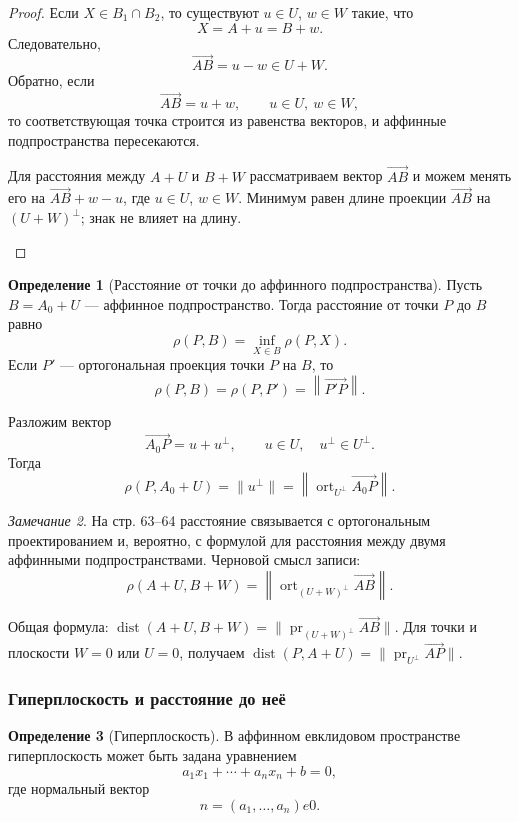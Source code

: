 \documentclass[12pt,a4paper]{article}
\theoremstyle{definition}
\newtheorem{definition}{Определение}[section]
\theoremstyle{plain}
\theoremstyle{remark}
\newtheorem{remark}[definition]{Замечание}
\newenvironment{knowledgefix}{\begin{clarifybox}}{\end{clarifybox}}
\newcommand{\dist}{\operatorname{dist}}
\newcommand{\pr}{\operatorname{pr}}
\newcommand{\ort}{\operatorname{ort}}
\begin{document}
\begin{proof}
Если $X\in B_1\cap B_2$, то существуют $u\in U$, $w\in W$ такие, что
\[
    X=A+u=B+w.
\]
Следовательно,
\[
    \overrightarrow{AB}=u-w\in U+W.
\]
Обратно, если
\[
    \overrightarrow{AB}=u+w,
    \qquad u\in U,\ w\in W,
\]
то соответствующая точка строится из равенства векторов, и аффинные подпространства пересекаются.
\begin{knowledgefix}
Для расстояния между \(A+U\) и \(B+W\) рассматриваем вектор \(\overrightarrow{AB}\) и можем менять его на \(\overrightarrow{AB}+w-u\), где \(u\in U\), \(w\in W\). Минимум равен длине проекции \(\overrightarrow{AB}\) на \((U+W)^\perp\); знак не влияет на длину.
\end{knowledgefix}
\end{proof}

\begin{definition}[Расстояние от точки до аффинного подпространства]
Пусть $B=A_0+U$ --- аффинное подпространство. Тогда расстояние от точки $P$ до $B$ равно
\[
    \rho(P,B)=\inf_{X\in B}\rho(P,X).
\]
Если $P'$ --- ортогональная проекция точки $P$ на $B$, то
\[
    \rho(P,B)=\rho(P,P')=\left\lVert \overrightarrow{P'P}\right\rVert.
\]
\end{definition}

Разложим вектор
\[
    \overrightarrow{A_0P}=u+u^\perp,
    \qquad u\in U,
    \quad u^\perp\in U^\perp.
\]
Тогда
\[
    \rho(P,A_0+U)=\lVert u^\perp\rVert
    =\left\lVert\ort_{U^\perp}\overrightarrow{A_0P}\right\rVert.
\]

\begin{remark}
На стр. 63--64 расстояние связывается с ортогональным проектированием и, вероятно, с формулой для расстояния между двумя аффинными подпространствами. Черновой смысл записи:
\[
    \rho(A+U,B+W)=\left\lVert \ort_{(U+W)^\perp}\overrightarrow{AB}\right\rVert.
\]
\begin{knowledgefix}
Общая формула: \(\dist(A+U,B+W)=\|\pr_{(U+W)^\perp}\overrightarrow{AB}\|\). Для точки и плоскости \(W=0\) или \(U=0\), получаем \(\dist(P,A+U)=\|\pr_{U^\perp}\overrightarrow{AP}\|\).
\end{knowledgefix}
\end{remark}

\subsubsection*{Гиперплоскость и расстояние до неё}

\begin{definition}[Гиперплоскость]
В аффинном евклидовом пространстве гиперплоскость может быть задана уравнением
\[
    a_1x_1+\cdots+a_nx_n+b=0,
\]
где нормальный вектор
\[
    n=(a_1,\ldots,a_n)
e0.
\]
\end{definition}
\end{document}
